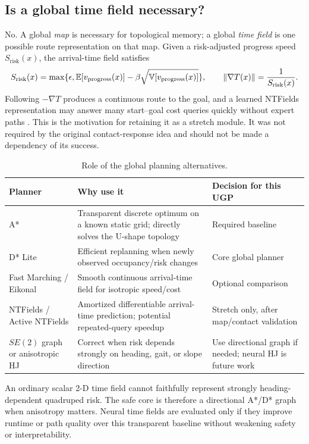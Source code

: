 \subsection{Is a global time field necessary?}

No. A global \emph{map} is necessary for topological memory; a global \emph{time field} is one possible route representation on that map. Given a risk-adjusted progress speed $S_{\mathrm{risk}}(x)$, the arrival-time field satisfies
\begin{equation}
S_{\mathrm{risk}}(x)=\max\{\epsilon,\mathbb{E}[v_{\mathrm{progress}}(x)]-\beta\sqrt{\mathbb{V}[v_{\mathrm{progress}}(x)]}\},
\qquad
\lVert\nabla T(x)\rVert=\frac{1}{S_{\mathrm{risk}}(x)}.
\label{eq:eikonal}
\end{equation}
Following $-\nabla T$ produces a continuous route to the goal, and a learned NTFields representation may answer many start--goal cost queries quickly without expert paths \citep{ni2023ntfields,liu2025active}. This is the motivation for retaining it as a stretch module. It was not required by the original contact-response idea and should not be made a dependency of its success.

\begin{table}[ht]
\centering
\caption{Role of the global planning alternatives.}
\label{tab:global_planners}
\small
\begin{tabularx}{\textwidth}{@{}L{29mm}Y Y@{}}
\toprule
\textbf{Planner} & \textbf{Why use it} & \textbf{Decision for this UGP}\\
\midrule
A* & Transparent discrete optimum on a known static grid; directly solves the U-shape topology & Required baseline\\
D* Lite & Efficient replanning when newly observed occupancy/risk changes & Core global planner\\
Fast Marching / Eikonal & Smooth continuous arrival-time field for isotropic speed/cost & Optional comparison\\
NTFields / Active NTFields & Amortized differentiable arrival-time prediction; potential repeated-query speedup & Stretch only, after map/contact validation\\
$SE(2)$ graph or anisotropic HJ & Correct when risk depends strongly on heading, gait, or slope direction & Use directional graph if needed; neural HJ is future work\\
\bottomrule
\end{tabularx}
\end{table}

An ordinary scalar 2-D time field cannot faithfully represent strongly heading-dependent quadruped risk. The safe core is therefore a directional A*/D* graph when anisotropy matters. Neural time fields are evaluated only if they improve runtime or path quality over this transparent baseline without weakening safety or interpretability.
